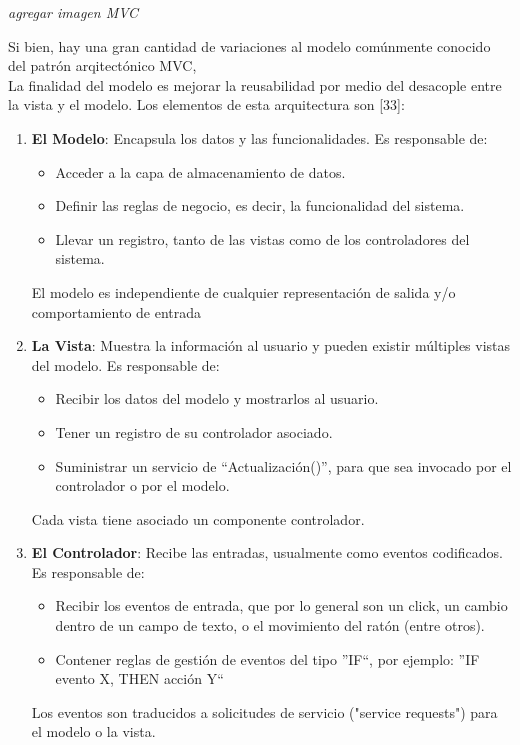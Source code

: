 \textit{agregar imagen MVC}

Si bien, hay una gran cantidad de variaciones al modelo comúnmente conocido del patrón arqitectónico MVC,\\

La finalidad del modelo es mejorar la reusabilidad por medio del desacople entre la vista y el modelo. Los elementos de esta
arquitectura son [33]:

\begin{enumerate}
 \item \textbf{El Modelo}: Encapsula los datos y las funcionalidades. Es responsable de:
	\begin{itemize}
	 \item Acceder a la capa de almacenamiento de datos.
	 \item Definir las reglas de negocio, es decir, la funcionalidad del sistema.
	 \item Llevar un registro, tanto de las vistas como de los controladores del sistema.
	\end{itemize}
       El modelo es independiente de cualquier representación de salida y/o comportamiento de entrada
 
 \item \textbf{La Vista}: Muestra la información al usuario y pueden existir múltiples vistas del modelo. Es responsable de:
	 \begin{itemize}
	  \item Recibir los datos del modelo y mostrarlos al usuario.
	  \item Tener un registro de su controlador asociado.
	  \item Suministrar un servicio de “Actualización()”, para que sea invocado por el controlador o por el modelo.
	 \end{itemize}
       Cada vista tiene asociado un componente  controlador.
       
 \item \textbf{El Controlador}: Recibe las entradas, usualmente como eventos codificados. Es responsable de:
	   \begin{itemize}
	    \item Recibir los eventos de entrada, que por lo general son un click, un cambio dentro de un campo de texto, o el
	          movimiento del ratón (entre otros).
	    \item Contener reglas de gestión de eventos del tipo ''IF``, por ejemplo: ''IF evento X, THEN acción Y`` 
	   \end{itemize}
       Los eventos son traducidos a solicitudes de servicio ("service requests") para el modelo o la vista.
\end{enumerate}

